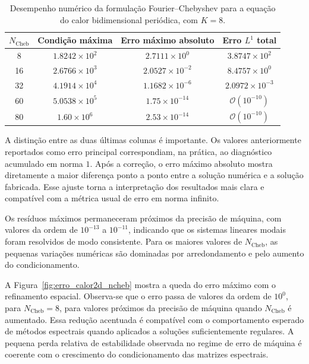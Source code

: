 \begin{table}[h!]
\centering
\caption{Desempenho numérico da formulação Fourier--Chebyshev para a equação do calor bidimensional periódica, com \(K=8\).}
\label{tab:calor2d}
\begin{tabular}{cccc}
\toprule
\(N_{\text{Cheb}}\) & Condição máxima & Erro máximo absoluto & Erro \(L^1\) total \\
\midrule
8  & \(1.8242\times 10^{2}\) & \(2.7111\times 10^{0}\)  & \(3.8747\times 10^{2}\) \\
16 & \(2.6766\times 10^{3}\) & \(2.0527\times 10^{-2}\) & \(8.4757\times 10^{0}\) \\
32 & \(4.1914\times 10^{4}\) & \(1.1682\times 10^{-6}\) & \(2.0972\times 10^{-3}\) \\
60 & \(5.0538\times 10^{5}\) & \(1.75\times 10^{-14}\) & \(\mathcal{O}(10^{-10})\) \\
80 & \(1.60\times 10^{6}\)  & \(2.53\times 10^{-14}\) & \(\mathcal{O}(10^{-10})\) \\
\bottomrule
\end{tabular}
\end{table}

A distinção entre as duas últimas colunas é importante. Os valores anteriormente reportados como erro principal correspondiam, na prática, ao diagnóstico acumulado em norma \(1\). Após a correção, o erro máximo absoluto mostra diretamente a maior diferença ponto a ponto entre a solução numérica e a solução fabricada. Esse ajuste torna a interpretação dos resultados mais clara e compatível com a métrica usual de erro em norma infinito.

Os resíduos máximos permaneceram próximos da precisão de máquina, com valores da ordem de \(10^{-13}\) a \(10^{-11}\), indicando que os sistemas lineares modais foram resolvidos de modo consistente. Para os maiores valores de \(N_{\text{Cheb}}\), as pequenas variações numéricas são dominadas por arredondamento e pelo aumento do condicionamento.

A Figura~\ref{fig:erro_calor2d_ncheb} mostra a queda do erro máximo com o refinamento espacial. Observa-se que o erro passa de valores da ordem de \(10^0\), para \(N_{\text{Cheb}}=8\), para valores próximos da precisão de máquina quando \(N_{\text{Cheb}}\) é aumentado. Essa redução acentuada é compatível com o comportamento esperado de métodos espectrais quando aplicados a soluções suficientemente regulares. A pequena perda relativa de estabilidade observada no regime de erro de máquina é coerente com o crescimento do condicionamento das matrizes espectrais.

